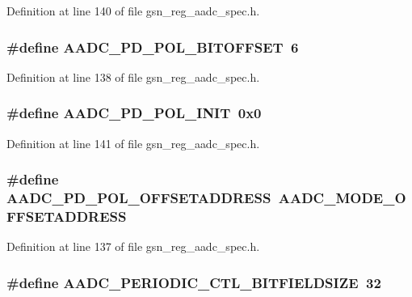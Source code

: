 Definition at line 140 of file gsn\_\-reg\_\-aadc\_\-spec.h.

\hypertarget{a00543_a555da8a74d6e992084224e448079dfdb}{
\subsubsection[{AADC\_\-PD\_\-POL\_\-BITOFFSET}]{\setlength{\rightskip}{0pt plus 5cm}\#define AADC\_\-PD\_\-POL\_\-BITOFFSET~6}}
\label{a00543_a555da8a74d6e992084224e448079dfdb}


Definition at line 138 of file gsn\_\-reg\_\-aadc\_\-spec.h.

\hypertarget{a00543_ae98c3aa321aa9f2aa5070cc718d5baa1}{
\subsubsection[{AADC\_\-PD\_\-POL\_\-INIT}]{\setlength{\rightskip}{0pt plus 5cm}\#define AADC\_\-PD\_\-POL\_\-INIT~0x0}}
\label{a00543_ae98c3aa321aa9f2aa5070cc718d5baa1}


Definition at line 141 of file gsn\_\-reg\_\-aadc\_\-spec.h.

\hypertarget{a00543_a1982d487e4aeb00f37a0e7bd4e9f5c62}{
\subsubsection[{AADC\_\-PD\_\-POL\_\-OFFSETADDRESS}]{\setlength{\rightskip}{0pt plus 5cm}\#define AADC\_\-PD\_\-POL\_\-OFFSETADDRESS~AADC\_\-MODE\_\-OFFSETADDRESS}}
\label{a00543_a1982d487e4aeb00f37a0e7bd4e9f5c62}


Definition at line 137 of file gsn\_\-reg\_\-aadc\_\-spec.h.

\hypertarget{a00543_a8aa22307663ec3181a1cbc24c3905cc4}{
\subsubsection[{AADC\_\-PERIODIC\_\-CTL\_\-BITFIELDSIZE}]{\setlength{\rightskip}{0pt plus 5cm}\#define AADC\_\-PERIODIC\_\-CTL\_\-BITFIELDSIZE~32}}
\label{a00543_a8aa22307663ec3181a1cbc24c3905cc4}


